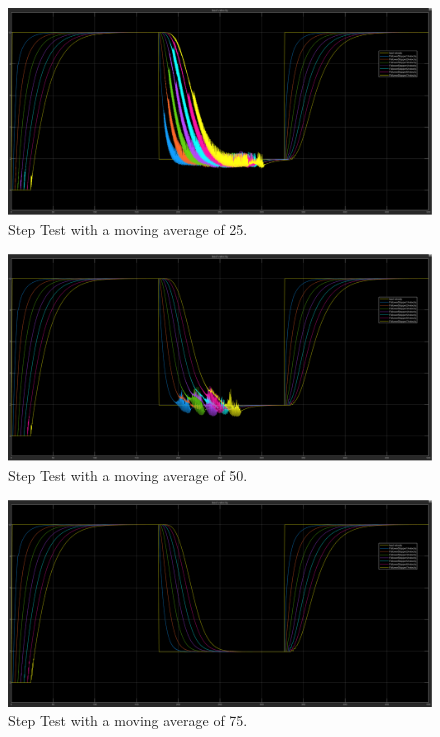 \documentclass[conference]{IEEEtran}
\begin{document}
\begin{appendix}
\begin{figure}[htbp!]
\centerline{\includegraphics[width=6.50 in]{multiFS_velbad_ma25.PNG}}
\caption{Step Test with a moving average of 25.}
\label{ma25}
\end{figure}

\begin{figure}[htbp!]
\centerline{\includegraphics[width=6.50 in]{multiFS_velbad_ma50.PNG}}
\caption{Step Test with a moving average of 50.}
\label{ma50}
\end{figure}

\begin{figure}[htbp!]
\centerline{\includegraphics[width=6.50 in]{multiFS_velbad_ma75.PNG}}
\caption{Step Test with a moving average of 75.}
\label{ma75}
\end{figure}


\end{appendix}
\end{document}

